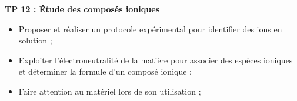 
\renewcommand{\thesection}{\textcolor{red}{Partie \Roman{section} -}}
\renewcommand{\thesubsection}{\textcolor{red}{\Roman{section}.\arabic{subsection}}}
\renewcommand{\thesubsubsection}{\textcolor{red}{\Roman{section}.\arabic{subsection}.\alph{subsubsection}}}

\setcounter{section}{0}
\setcounter{document}{0}

\begin{center}
\begin{mdframed}[style=titr, leftmargin=60pt, rightmargin=60pt, innertopmargin=7pt, innerbottommargin=7pt, innerrightmargin=8pt, innerleftmargin=8pt]

\begin{center}
\large{\textbf{TP 12 : \'{E}tude des composés ioniques
}}
\end{center}
\end{mdframed}
\end{center}


\begin{tcolorbox}[colback=blue!5!white,colframe=blue!75!black,title=Objectifs de la séance :]
\begin{itemize}
    \item Proposer et réaliser un protocole expérimental pour identifier des ions en solution  ;
    \item Exploiter l’électroneutralité de la matière pour associer des espèces ioniques et déterminer la formule d’un composé ionique ;
\end{itemize}
\end{tcolorbox}

\begin{tcolorbox}[colback=red!5!white,colframe=red!75!black,title= Consignes :]
\begin{itemize}
    \item Faire attention au matériel lors de son utilisation ;
\end{itemize}
\end{tcolorbox}


